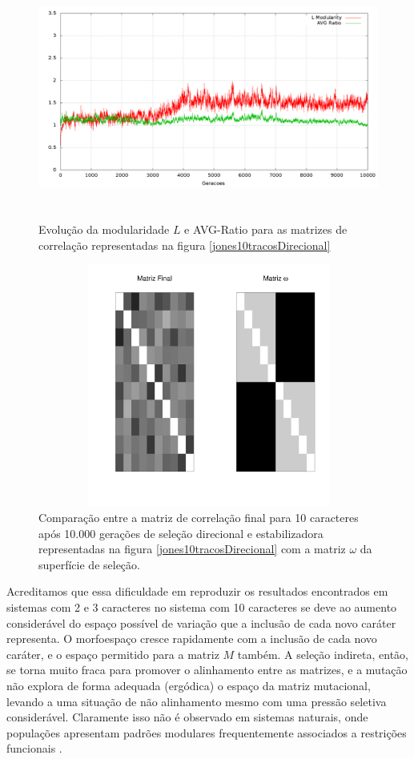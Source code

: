 \begin{figure}[htbp]
  \centering
  \includegraphics[width=150mm, height=80mm]{figuras/jones10tracosDirecionalStats.png}
  \caption{Evolução da modularidade $L$ e AVG-Ratio para as matrizes de
  correlação representadas na figura \ref{jones10tracosDirecional}}
  \label{jones10tracosDirecionalStats}
\end{figure}



\begin{figure}[htbp]
  \centering
  \includegraphics[width=150mm, height=80mm]{figuras/Mat10tracosDirecional}
   \caption{Comparação entre a matriz de correlação final para 10 caracteres
   após 10.000 gerações de seleção direcional e estabilizadora
   representadas na figura \ref{jones10tracosDirecional} com a matriz
   $\omega$ da superfície de seleção.}
  \label{MatJones10tracosDirecional}
\end{figure}


Acreditamos que essa dificuldade em reproduzir os resultados encontrados
em sistemas com 2 e 3 caracteres no sistema com 10 caracteres se deve ao aumento
considerável do espaço possível de variação que a inclusão de cada novo
caráter representa. 
O morfoespaço cresce rapidamente com a inclusão de cada novo caráter, e
o espaço permitido para a matriz $M$ também. 
A seleção indireta, então, se torna muito fraca para promover o
alinhamento entre as matrizes, e a mutação não explora de forma adequada
(ergódica) o espaço da matriz mutacional, levando a uma situação de não alinhamento
mesmo com uma pressão seletiva considerável. 
Claramente isso não é observado em sistemas naturais, onde populações
apresentam padrões modulares frequentemente associados a restrições
funcionais \citep{Porto2009}. 

